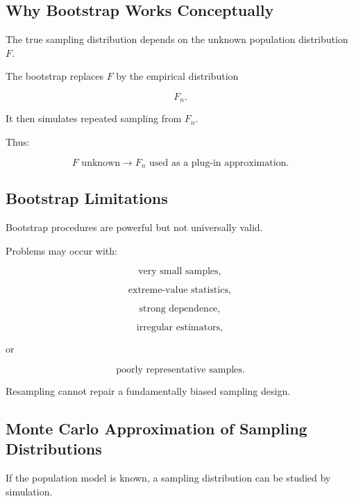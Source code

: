 \subsection{Why Bootstrap Works Conceptually}
\label{subsec:why-bootstrap-works}

The true sampling distribution depends on the unknown population
distribution \(F\).

The bootstrap replaces \(F\) by the empirical distribution

\[
F_n.
\]

It then simulates repeated sampling from \(F_n\).

Thus:

\[
\boxed{
F
\text{ unknown}
\longrightarrow
F_n
\text{ used as a plug-in approximation}.
}
\]

\subsection{Bootstrap Limitations}
\label{subsec:bootstrap-limitations}

Bootstrap procedures are powerful but not universally valid.

Problems may occur with:

\[
\boxed{
\text{very small samples},
}
\]

\[
\boxed{
\text{extreme-value statistics},
}
\]

\[
\boxed{
\text{strong dependence},
}
\]

\[
\boxed{
\text{irregular estimators},
}
\]

or

\[
\boxed{
\text{poorly representative samples}.
}
\]

Resampling cannot repair a fundamentally biased sampling design.

\subsection{Monte Carlo Approximation of Sampling Distributions}
\label{subsec:monte-carlo-sampling-distributions}

If the population model is known, a sampling distribution can be studied
by simulation.

